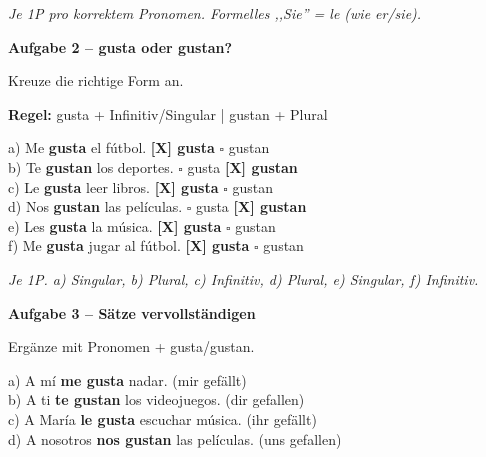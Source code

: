 \documentclass[11pt, a4paper]{article}
\newcommand{\fachfarbe}{spanisch}
\newcommand{\punktebox}[1]{\hfill\fbox{\small \_/#1}}
\newcommand{\lsg}[1]{\textcolor{loesung}{\textbf{#1}}}
\newenvironment{aufgabe}[1]{%
    \needspace{5\baselineskip}%
    \nopagebreak[4]%
    \vspace{10pt}
    \noindent\textbf{\textcolor{\fachfarbe}{Aufgabe #1}}
    \nopagebreak[4]%
    \vspace{5pt}
    \nopagebreak[4]%
    \begin{list}{}{\leftmargin=0pt}
    \item[]
}{%
    \end{list}
}
\begin{document}
\textit{\textcolor{grau}{Je 1P pro korrektem Pronomen. Formelles ,,Sie'' = le (wie er/sie).}}

\vspace{15pt}


\begin{aufgabe}{2 -- gusta oder gustan?}
Kreuze die richtige Form an. \punktebox{6}
\end{aufgabe}

\begin{hinweisbox}
\textbf{Regel:} gusta + Infinitiv/Singular | gustan + Plural
\end{hinweisbox}

\vspace{0.5em}

\noindent
a) Me \lsg{gusta} el fútbol. \hfill \lsg{[X] gusta} \quad $\square$ gustan\\[0.8em]
b) Te \lsg{gustan} los deportes. \hfill $\square$ gusta \quad \lsg{[X] gustan}\\[0.8em]
c) Le \lsg{gusta} leer libros. \hfill \lsg{[X] gusta} \quad $\square$ gustan\\[0.8em]
d) Nos \lsg{gustan} las películas. \hfill $\square$ gusta \quad \lsg{[X] gustan}\\[0.8em]
e) Les \lsg{gusta} la música. \hfill \lsg{[X] gusta} \quad $\square$ gustan\\[0.8em]
f) Me \lsg{gusta} jugar al fútbol. \hfill \lsg{[X] gusta} \quad $\square$ gustan

\textit{\textcolor{grau}{Je 1P. a) Singular, b) Plural, c) Infinitiv, d) Plural, e) Singular, f) Infinitiv.}}

\vspace{15pt}


\begin{aufgabe}{3 -- Sätze vervollständigen}
Ergänze mit Pronomen + gusta/gustan. \punktebox{8}
\end{aufgabe}

\noindent
a) A mí \lsg{me gusta} nadar. (mir gefällt)\\[1em]
b) A ti \lsg{te gustan} los videojuegos. (dir gefallen)\\[1em]
c) A María \lsg{le gusta} escuchar música. (ihr gefällt)\\[1em]
d) A nosotros \lsg{nos gustan} las películas. (uns gefallen)
\end{document}
